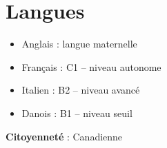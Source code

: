 \documentclass[letterpaper,fontsize=10.5pt]{scrartcl}
\begin{document}
\section{Langues}
\begin{itemize}[itemsep=0em, topsep=0em, partopsep=0em]
	\item Anglais : langue maternelle
	\item Français : C1 -- niveau autonome
	\item Italien : B2 -- niveau avancé
	\item Danois : B1 -- niveau seuil \\
\end{itemize}

{}\textbf{Citoyenneté} : Canadienne\\


\end{document}
